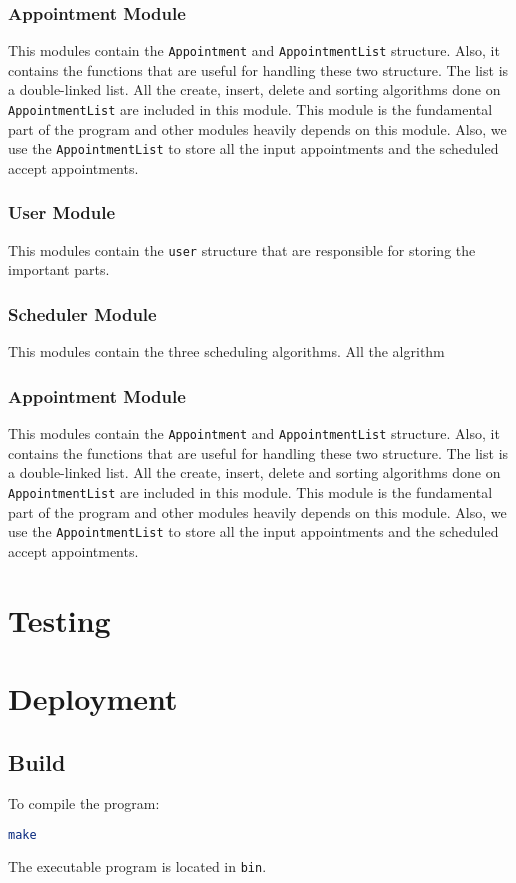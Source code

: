 \documentclass[12pt,a4paper]{report}
\begin{document}
\subsection{Appointment Module}
This modules contain the \texttt{Appointment} and \texttt{AppointmentList} structure. Also, it contains the functions that are useful for handling these two structure. The list is a double-linked list. All the create, insert, delete and sorting algorithms done on \texttt{AppointmentList} are included in this module. This module is the fundamental part of the program and other modules heavily depends on this module. Also, we use the \texttt{AppointmentList} to store all the input appointments and the scheduled accept appointments.
\subsection{User Module}
This modules contain the \texttt{user} structure that are responsible for storing the important parts.
\subsection{Scheduler Module}
This modules contain the three scheduling algorithms. All the algrithm

\subsection{Appointment Module}
This modules contain the \texttt{Appointment} and \texttt{AppointmentList} structure. Also, it contains the functions that are useful for handling these two structure. The list is a double-linked list. All the create, insert, delete and sorting algorithms done on \texttt{AppointmentList} are included in this module. This module is the fundamental part of the program and other modules heavily depends on this module. Also, we use the \texttt{AppointmentList} to store all the input appointments and the scheduled accept appointments.
\chapter{Testing}
\chapter{Deployment}
\section{Build}
To compile the program:
\begin{lstlisting}[language=bash,basicstyle=\ttfamily,keywordstyle=\bfseries]
make
\end{lstlisting}
The executable program is located in \texttt{bin}.
\end{document}
